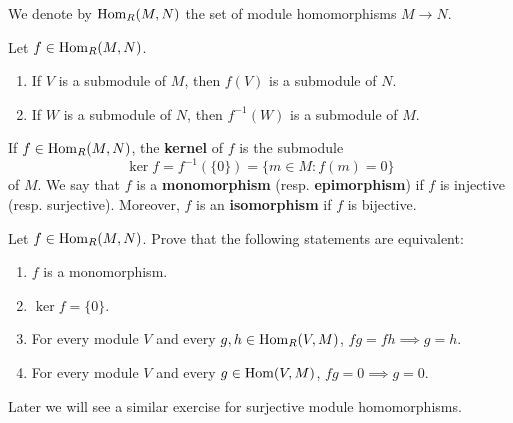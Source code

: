 We denote by $\operatorname{Hom}_R(M,N)$ the set of module homomorphisms $M\to N$. 

\begin{exercise}
Let $f\in\operatorname{Hom}_R(M,N)$.  
\begin{enumerate}
\item If $V$ is a submodule of $M$, then $f(V)$ is a submodule of $N$.
\item If $W$ is a submodule of $N$, then $f^{-1}(W)$ is a submodule of $M$.
\end{enumerate}
\end{exercise}

If $f\in\operatorname{Hom}_R(M,N)$, the \textbf{kernel} of $f$ is the submodule  
\[
\ker f=f^{-1}(\{0\})=\{m\in M:f(m)=0\}
\]
of $M$. We say that $f$ is a \textbf{monomorphism} (resp. \textbf{epimorphism}) 
if $f$ is injective (resp. surjective). Moreover, $f$ is an \textbf{isomorphism} 
if $f$ is
bijective. 

\begin{exercise}
Let $f\in\operatorname{Hom}_R(M,N)$. Prove that the following statements are equivalent:
\begin{enumerate}
\item $f$ is a monomorphism.
\item $\ker f=\{0\}$.
\item For every module $V$ and every $g,h\in\operatorname{Hom}_R(V,M)$, $fg=fh\implies g=h$.
\item For every module $V$ and every $g\in\operatorname{Hom}(V,M)$, $fg=0\implies g=0$.
\end{enumerate}
\end{exercise}

Later we will see a similar exercise for surjective module homomorphisms.

